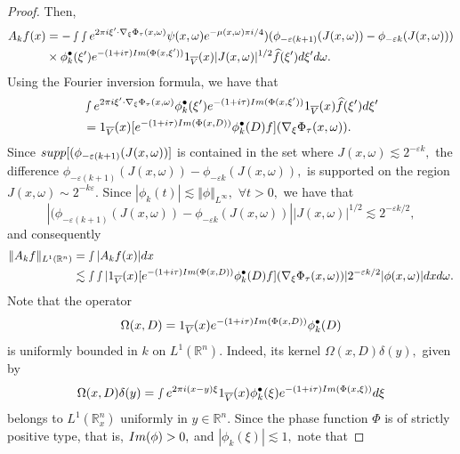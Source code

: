\documentclass[12pt, reqno]{amsart}
\theoremstyle{definition}
\theoremstyle{remark}
\numberwithin{equation}{section}
\begin{document}
\begin{proof}
Then,
\begin{align*}
    A_kf(x)&=- \smallint\smallint e^{2\pi i\xi'\cdot \nabla_\xi\Phi_\tau(x,\omega)}\psi(x,\omega)e^{-\mu(x,\omega)\pi i/4}) (\phi_{-\varepsilon (k+1)}(J(x,\omega))-\phi_{-\varepsilon k}(J(x,\omega)))\\
&\times \phi_{k}^\bullet(\xi')e^{-(1+i\tau)\textnormal{Im}(\Phi(x,\xi'))} 1_{\overline{V}}(x) |J(x,\omega)|^{1/2}\widehat{f}(\xi')d\xi'd\omega. 
\end{align*}
Using the Fourier inversion formula, we have that
\begin{align*}
   & \smallint e^{2\pi i\xi'\cdot \nabla_\xi\Phi_\tau(x,\omega)} \phi_{k}^\bullet(\xi') e^{-(1+i\tau)\textnormal{Im}(\Phi(x,\xi'))}1_{\overline{V}}(x) \widehat{f}(\xi')d\xi'\\
   &=1_{\overline{V}}(x)[e^{-(1+i\tau)\textnormal{Im}(\Phi(x,D))}\phi_{k}^\bullet(D)f](\nabla_\xi\Phi_\tau(x,\omega)).
\end{align*} Since $\textnormal{supp}[(\phi_{-\varepsilon (k+1)}(J(x,\omega))]$ is contained in the set where $J(x,\omega)\lesssim 2^{-\varepsilon k},$ the difference $\phi_{-\varepsilon (k+1)}(J(x,\omega))-\phi_{-\varepsilon k}(J(x,\omega)),$ is supported on the region $J(x,\omega)\sim 2^{-k\varepsilon}.$ Since $|\phi_k(t)|\lesssim \Vert\phi\Vert_{L^{\infty}},$ $\forall t>0,$ we have that $$|(\phi_{-\varepsilon (k+1)}(J(x,\omega))-\phi_{-\varepsilon k}(J(x,\omega))||J(x,\omega)|^{1/2}\lesssim 2^{-\varepsilon k/2},$$
and consequently
\begin{align*}
    \Vert A_k f\Vert_{L^1(\mathbb{R}^n)}  &=\smallint|A_k f(x)|dx\\
    &\lesssim\smallint\smallint |1_{\overline{V}}(x)[e^{-(1+i\tau)\textnormal{Im}(\Phi(x,D))}\phi_{k}^\bullet (D)f](\nabla_\xi\Phi_\tau(x,\omega))|2^{-\varepsilon k/2}|\phi(x,\omega)|dx d\omega.
\end{align*}    Note that the operator 
\begin{equation*}
   \Omega(x,D)= 1_{\overline{V}}(x)e^{-(1+i\tau)\textnormal{Im}(\Phi(x,D))}\phi_{k}^\bullet(D)
\end{equation*}is uniformly bounded in $k$ on $L^1(\mathbb{R}^n).$ Indeed, its kernel $\Omega(x,D)\delta(y),$ given by  
$$ \Omega(x,D)\delta(y)=\smallint e^{2\pi i(x-y)\xi}1_{\overline{V}}(x)\phi_{k}^\bullet(\xi)e^{-(1+i\tau)\textnormal{Im}(\Phi(x,\xi))}d\xi  $$
belongs to $L^1(\mathbb{R}_x^n)$ uniformly in $y\in \mathbb{R}^n.$
Since  the phase function $\Phi$ is of strictly positive type, that is, $\textnormal{Im}(\phi)> 0,$ and $|\phi_{k}(\xi)|\lesssim 1,$ note that

\end{proof}
\end{document}
